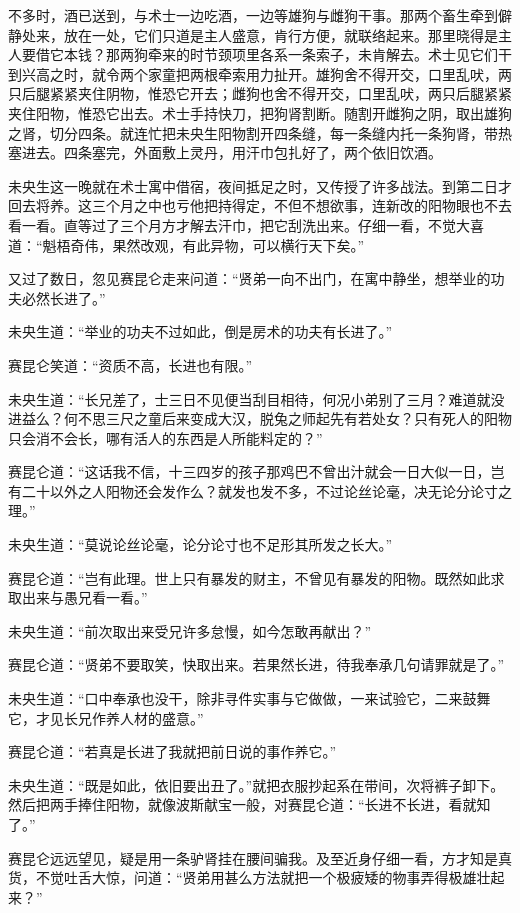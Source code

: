 \documentclass[a4paper,12pt,UTF8,twoside]{ctexbook}
\begin{document}
不多时，酒已送到，与术士一边吃酒，一边等雄狗与雌狗干事。那两个畜生牵到僻静处来，放在一处，它们只道是主人盛意，肯行方便，就联络起来。那里晓得是主人要借它本钱？那两狗牵来的时节颈项里各系一条索子，未肯解去。术士见它们干到兴高之时，就令两个家童把两根牵索用力扯开。雄狗舍不得开交，口里乱吠，两只后腿紧紧夹住阴物，惟恐它开去；雌狗也舍不得开交，口里乱吠，两只后腿紧紧夹住阳物，惟恐它出去。术士手持快刀，把狗肾割断。随割开雌狗之阴，取出雄狗之肾，切分四条。就连忙把未央生阳物割开四条缝，每一条缝内托一条狗肾，带热塞进去。四条塞完，外面敷上灵丹，用汗巾包扎好了，两个依旧饮酒。

未央生这一晚就在术士寓中借宿，夜间抵足之时，又传授了许多战法。到第二日才回去将养。这三个月之中也亏他把持得定，不但不想欲事，连新改的阳物眼也不去看一看。直等过了三个月方才解去汗巾，把它刮洗出来。仔细一看，不觉大喜道：“魁梧奇伟，果然改观，有此异物，可以横行天下矣。”

又过了数日，忽见赛昆仑走来问道：“贤弟一向不出门，在寓中静坐，想举业的功夫必然长进了。”

未央生道：“举业的功夫不过如此，倒是房术的功夫有长进了。”

赛昆仑笑道：“资质不高，长进也有限。”

未央生道：“长兄差了，士三日不见便当刮目相待，何况小弟别了三月？难道就没进益么？何不思三尺之童后来变成大汉，脱兔之师起先有若处女？只有死人的阳物只会消不会长，哪有活人的东西是人所能料定的？”

赛昆仑道：“这话我不信，十三四岁的孩子那鸡巴不曾出汁就会一日大似一日，岂有二十以外之人阳物还会发作么？就发也发不多，不过论丝论毫，决无论分论寸之理。”

未央生道：“莫说论丝论毫，论分论寸也不足形其所发之长大。”

赛昆仑道：“岂有此理。世上只有暴发的财主，不曾见有暴发的阳物。既然如此求取出来与愚兄看一看。”

未央生道：“前次取出来受兄许多怠慢，如今怎敢再献出？”

赛昆仑道：“贤弟不要取笑，快取出来。若果然长进，待我奉承几句请罪就是了。”

未央生道：“口中奉承也没干，除非寻件实事与它做做，一来试验它，二来鼓舞它，才见长兄作养人材的盛意。”

赛昆仑道：“若真是长进了我就把前日说的事作养它。”

未央生道：“既是如此，依旧要出丑了。”就把衣服抄起系在带间，次将裤子卸下。然后把两手捧住阳物，就像波斯献宝一般，对赛昆仑道：“长进不长进，看就知了。”

赛昆仑远远望见，疑是用一条驴肾挂在腰间骗我。及至近身仔细一看，方才知是真货，不觉吐舌大惊，问道：“贤弟用甚么方法就把一个极疲矮的物事弄得极雄壮起来？”
\end{document}
